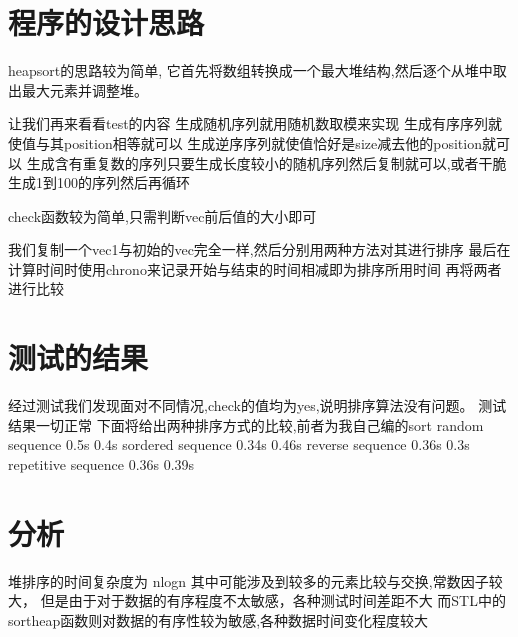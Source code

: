 \documentclass[UTF8]{ctexart}
\begin{document}
\pagestyle{fancy}
\fancyhead{}

\section{程序的设计思路}

heapsort的思路较为简单,
它首先将数组转换成一个最大堆结构,然后逐个从堆中取出最大元素并调整堆。

让我们再来看看test的内容
生成随机序列就用随机数取模来实现
生成有序序列就使值与其position相等就可以
生成逆序序列就使值恰好是size减去他的position就可以
生成含有重复数的序列只要生成长度较小的随机序列然后复制就可以,或者干脆生成1到100的序列然后再循环

check函数较为简单,只需判断vec前后值的大小即可

我们复制一个vec1与初始的vec完全一样,然后分别用两种方法对其进行排序
最后在计算时间时使用chrono来记录开始与结束的时间相减即为排序所用时间
再将两者进行比较

\section{测试的结果}

经过测试我们发现面对不同情况,check的值均为yes,说明排序算法没有问题。
测试结果一切正常
下面将给出两种排序方式的比较,前者为我自己编的sort
random sequence 0.5s 0.4s
sordered sequence 0.34s 0.46s
reverse sequence 0.36s 0.3s
repetitive sequence 0.36s 0.39s

\section{分析}

堆排序的时间复杂度为 nlogn
其中可能涉及到较多的元素比较与交换,常数因子较大，
但是由于对于数据的有序程度不太敏感，各种测试时间差距不大
而STL中的sortheap函数则对数据的有序性较为敏感,各种数据时间变化程度较大
\end{document}
